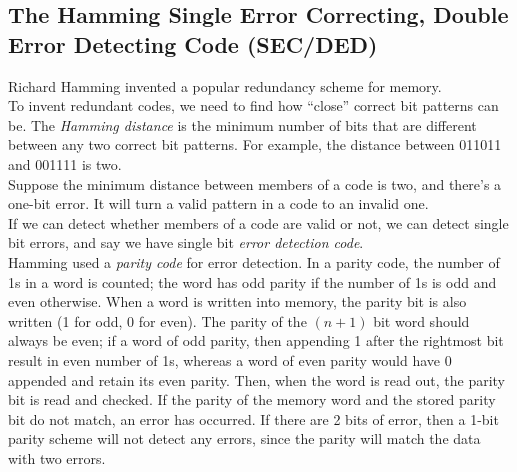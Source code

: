 \documentclass[12pt]{article}
\theoremstyle{definition}
\begin{document}
  \subsection{The Hamming Single Error Correcting, Double Error Detecting Code (SEC/DED)}
  Richard Hamming invented a popular redundancy scheme for memory. \\
  To invent redundant codes, we need to find how ``close'' correct bit patterns can be.
  The \emph{Hamming distance} is the minimum number of bits that are different between any two correct bit patterns.
  For example, the distance between 011011 and 001111 is two. \\
  Suppose the minimum distance between members of a code is two, and there's a one-bit error.
  It will turn a valid pattern in a code to an invalid one. \\
  If we can detect whether members of a code are valid or not,  we can detect single bit errors, and say we have single bit \emph{error detection code}. \\

  Hamming used a \emph{parity code} for error detection.
  In a parity code, the number of 1s in a word is counted;
  the word has odd parity if the number of 1s is odd and even otherwise.
  When a word is written into memory, the parity bit is also written (1 for odd, 0 for even).
  The parity of the $(n + 1)$ bit word should always be even;
  if a word of odd parity, then appending 1 after the rightmost bit result in even number of 1s, whereas a word of even parity would have 0 appended and retain its even parity.
  Then, when the word is read out, the parity bit is read and checked.
  If the parity of the memory word and the stored parity bit do not match, an error has occurred.
  \newline
  If there are 2 bits of error, then a 1-bit parity scheme will not detect any errors, since the parity will match the data with two errors. \\
\end{document}
